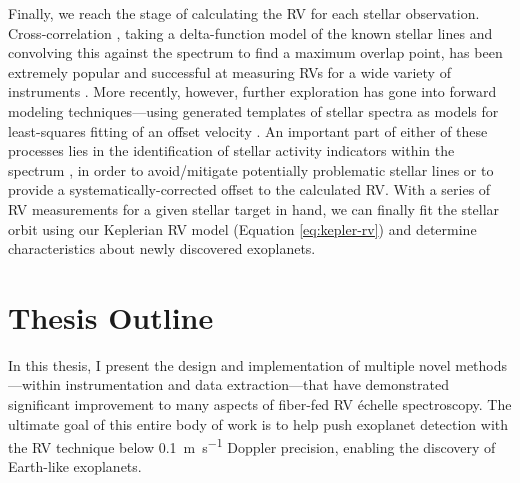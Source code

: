 Finally, we reach the stage of calculating the RV for each stellar observation. Cross-correlation \citep{baranne_coravel_1979}, taking a delta-function model of the known stellar lines and convolving this against the spectrum to find a maximum overlap point, has been extremely popular and successful at measuring RVs for a wide variety of instruments \citep[e.g.][]{freudling_automated_2013, brahm_ceres_2017, modigliani_espresso_2019}. More recently, however, further exploration has gone into forward modeling techniques---using generated templates of stellar spectra as models for least-squares fitting of an offset velocity \citep[e.g.][]{zechmeister_spectrum_2018, rajpaul_robust_2020}. An important part of either of these processes lies in the identification of stellar activity indicators within the spectrum \citep[e.g.][]{davis_insights_2017, dumusque_measuring_2018}, in order to avoid/mitigate potentially problematic stellar lines or to provide a systematically-corrected offset to the calculated RV. With a series of RV measurements for a given stellar target in hand, we can finally fit the stellar orbit using our Keplerian RV model (Equation \ref{eq:kepler-rv}) and determine characteristics about newly discovered exoplanets.

\section{Thesis Outline} \label{intro:structure}

In this thesis, I present the design and implementation of multiple novel methods---within instrumentation and data extraction---that have demonstrated significant improvement to many aspects of fiber-fed RV \'echelle spectroscopy. The ultimate goal of this entire body of work is to help push exoplanet detection with the RV technique below 0.1~\si{\meter\per\second} Doppler precision, enabling the discovery of Earth-like exoplanets.

